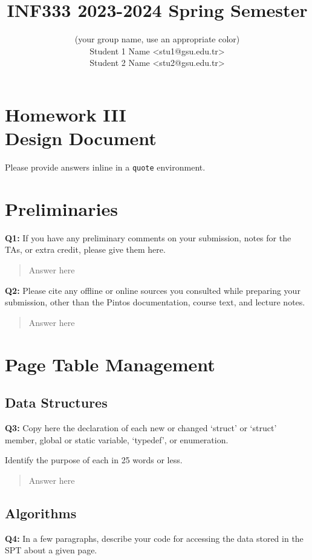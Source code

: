 \documentclass[a4paper,11pt]{paper}
\title{INF333 2023-2024 Spring Semester}
\author{
\textbf{\color{blue}{Şirinler}} {\small(your group name, use an appropriate color)}
\\ Student 1 Name <stu1@gsu.edu.tr>
\\ Student 2 Name <stu2@gsu.edu.tr>}
\begin{document}
\maketitle

\section*{\LARGE Homework III \\
Design Document}

Please provide answers inline in a \texttt{quote} environment.


\section{Preliminaries}

\textbf{Q1:} If you have any preliminary comments on your submission, notes for the TAs, or extra credit, please give them here.
\begin{quote}
  Answer here
\end{quote}


\textbf{Q2:} Please cite any offline or online sources you consulted while preparing your
submission, other than the Pintos documentation, course text, and lecture notes.
\begin{quote}
  Answer here
\end{quote}

\section{Page Table Management}

\subsection{Data Structures}
\textbf{Q3:} Copy here the declaration of each new or changed `struct' or `struct' member, global or static variable, `typedef', or enumeration.

Identify the purpose of each in 25 words or less.
\begin{quote}
  Answer here
\end{quote}

\subsection{Algorithms}

\textbf{Q4:} In a few paragraphs, describe your code for accessing the data
stored in the SPT about a given page.
\end{document}
